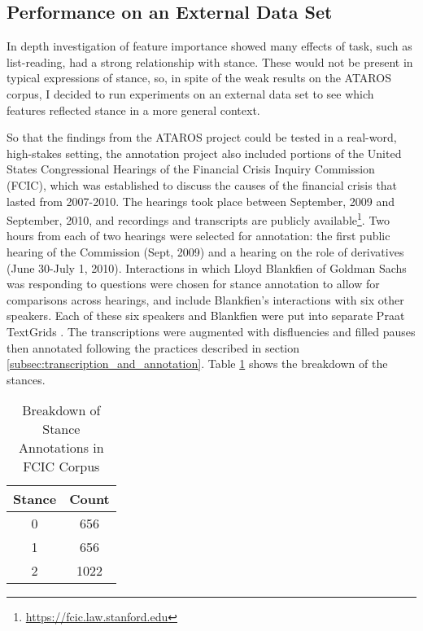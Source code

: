 \subsection{Performance on an External Data Set} 

In depth investigation of feature importance showed many effects of task, such as list-reading, had a strong relationship with stance.  These would not be present in typical expressions of stance, so, in spite of the weak results on the ATAROS corpus, I decided to run experiments on an external data set to see which features reflected stance in a more general context.  

So that the findings from the ATAROS project could be tested in a real-word, high-stakes setting, the annotation project also included portions of the United States Congressional Hearings of the Financial Crisis Inquiry Commission (FCIC), which was established to discuss the causes of the financial crisis that lasted from 2007-2010.  The hearings took place between September, 2009 and September, 2010, and recordings and transcripts are publicly available\footnote{\url{https://fcic.law.stanford.edu}}.  Two hours from each of two hearings were selected for annotation: the first public hearing of the Commission (Sept, 2009) and a hearing on the role of derivatives (June 30-July 1, 2010).  Interactions in which Lloyd Blankfien of Goldman Sachs was responding to questions were chosen for stance annotation to allow for comparisons across hearings, and include Blankfien's interactions with six other speakers.  
Each of these six speakers and Blankfien were put into separate Praat TextGrids \cite{boersma2002praat}.  The transcriptions were augmented with disfluencies and filled pauses then annotated following the practices described in section \ref{subsec:transcription_and_annotation}.  Table \ref{tab:fcic_stance_distro} shows the breakdown of the stances.


\begin{table}[h]
\centering
\begin{tabular}{c |  c } 
	\textbf{Stance} & \textbf{Count} \\
	\hline
	0               & 656 \\
	1               & 656 \\ 
	2               & 1022 \\
\end{tabular}
\caption{Breakdown of Stance Annotations in FCIC Corpus}
\label{tab:fcic_stance_distro} 
\end{table}

